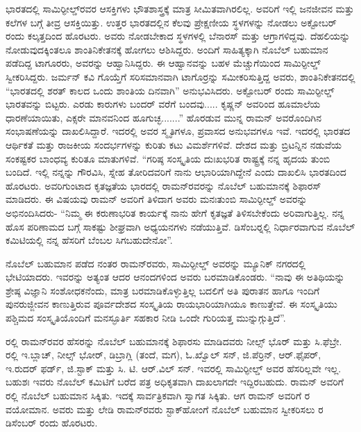 ಭಾರತದಲ್ಲಿ ಸಾಮಿರ್‍ಫೀಲ್ಡ್‌ರವರ ಆಸಕ್ತಿಗಳು ಭೌತಶಾಸ್ತ್ರಕ್ಕೆ ಮಾತ್ರ ಸೀಮಿತವಾಗಿರಲಿಲ್ಲ. ಅವರಿಗೆ ಇಲ್ಲಿ ಜನಜೀವನ ಮತ್ತು ಕಲೆಗಳ ಬಗ್ಗೆ ತೀವ್ರ ಆಸಕ್ತಿಯಿತ್ತು. ಉತ್ತರ ಭಾರತದಲ್ಲಿನ ಕೆಲವು ಪ್ರೇಕ್ಷಣೀಯ ಸ್ಥಳಗಳನ್ನು ನೋಡಲು  ಅಕ್ಟೋಬರ್ ರಂದು ಕಲ್ಕತ್ತದಿಂದ ಹೊರಟರು. ಅವರು ನೋಡಬೇಕಾದ ಸ್ಥಳಗಳಲ್ಲಿ ಬೆನಾರಸ್ ಮತ್ತು ಆಗ್ರಾಗಳಿದ್ದವು. ದೆಹಲಿಯನ್ನು ನೋಡುವುದಕ್ಕಿಂತಲೂ ಶಾಂತಿನಿಕೇತನಕ್ಕೆ ಹೋಗಲು ಆಶಿಸಿದ್ದರು. ಅಂದಿಗೆ ಸಾಹಿತ್ಯಕ್ಕಾಗಿ ನೊಬೆಲ್ ಬಹುಮಾನ ಪಡೆದಿದ್ದ ಟಾಗೂರರು, ಅವರನ್ನು ಆಹ್ವಾನಿಸಿದ್ದರು. ಈ ಆಹ್ವಾನವನ್ನು ಬಹಳ ಮೆಚ್ಚುಗೆಯಿಂದ ಸಾಮಿರ್‍ಫೀಲ್ಡ್ ಸ್ವೀಕರಿಸಿದ್ದರು. ಜರ್ಮನ್ ಕವಿ ಗೊಯ್ತೆಗೆ ಸರಿಸಮಾನವಾಗಿ ಟಾಗೊರ್‍ರನ್ನು ಸಮೀಕರಿಸುತ್ತಿದ್ದ ಅವರು, ಶಾಂತಿನಿಕೇತನದಲ್ಲಿ “ಭಾರತದಲ್ಲಿ ಶರತ್ ಕಾಲದ ಒಂದು ಶಾಂತಿಯ ದಿನವಾಗಿ” ಅನುಭವಿಸಿದರು. ಅಕ್ಟೋಬರ್  ರಂದು ಸಾಮಿರ್‍ಫೀಲ್ಡ್ ಭಾರತವನ್ನು ಬಿಟ್ಟರು. ಎರಡು ಕಾರುಗಳು ಬಂದರ್ ವರೆಗೆ ಬಂದವು..... ಕೃಷ್ಣನ್ ಅವರಿಂದ ಹೂಮಾಲೆಯ ಧಾರಣೆಯಾಯಿತು, ಎಕ್ಸರೇ ಮಾನವನಿಂದ ಹೂಗುಚ್ಛ.......” ಹೊರಡುವ ಮುನ್ನ ರಾಮನ್ ಅವರೊಂದಿಗಿನ ಸಂಭಾಷಣೆಯನ್ನು ದಾಖಲಿಸಿದ್ದಾರೆ. ಇದರಲ್ಲಿ ಅವರ ಸ್ಮೃತಿಗಳೂ, ಪ್ರವಾಸದ ಅನುಭವಗಳೂ ಇವೆ. ಇದರಲ್ಲಿ ಭಾರತದ ಆರ್ಥಿಕತೆ ಮತ್ತು ರಾಜಕೀಯ ಸಂದರ್ಭಗಳನ್ನು ಕುರಿತು ಕಟು ವಿಮರ್ಶೆಗಳಿವೆ. ದೇಶದ ಮತ್ತು ಬ್ರಿಟನ್ನಿನ ನಡುವೆಯ ಸಂಕಷ್ಟಕರ ಬಾಂಧವ್ಯ ಕುರಿತೂ ಮಾತುಗಳಿವೆ. “ಗರಿಷ್ಠ ಸಂಸ್ಕೃತಿಯ ದುಃಖಭರಿತ ರಾಷ್ಟ್ರಕ್ಕೆ ನನ್ನ ಹೃದಯ ತುಂಬಿ ಬಂದಿದೆ. ಇಲ್ಲಿ ನನ್ನನ್ನು ಗೌರವಿಸಿ, ಸ್ನೇಹ ತೋರಿದವರಿಗೆ ನಾನು ಆಭಾರಿಯಾಗಿದ್ದೇನೆ ಎಂದು ದಾಖಲಿಸಿ ಭಾರತದಿಂದ ಹೊರಟರು. ಅವರಿಗುಂಟಾದ ಕೃತಜ್ಞತೆಯ ಭಾರದಲ್ಲಿ ರಾಮನ್‍ರವರನ್ನು ನೊಬೆಲ್ ಬಹುಮಾನಕ್ಕೆ ಶಿಫಾರಸ್ ಮಾಡಿದರು. ಈ ವಿಷಯವು ರಾಮನ್ ಅವರಿಗೆ ತಿಳಿದಾಗ ಅವರು ಮನಃತುಂಬಿ ಸಾಮಿರ್‍ಫೀಲ್ಡ್ ಅವರನ್ನು ಅಭಿನಂದಿಸಿದರು- “ನಿಮ್ಮ ಈ ಕರುಣಾಭರಿತ ಕಾರ್ಯಕ್ಕೆ ನಾನು ಹೇಗೆ ಕೃತಜ್ಞತೆ ತಿಳಿಸಬೇಕೆಂದು ಅರಿವಾಗುತ್ತಿಲ್ಲ. ನನ್ನ ಹೊಸ ಪರಿಣಾಮದ ಬಗ್ಗೆ ಸಾಕಷ್ಟು ಶೀಘ್ರವಾಗಿ ಅಧ್ಯಯನಗಳು ನಡೆಯುತ್ತಿವೆ. ಡಿಸೆಂಬರ್‍ನಲ್ಲಿ ನಿರ್ಧಾರವಾಗುವ ನೊಬೆಲ್ ಕಮಿಟಿಯಲ್ಲಿ ನನ್ನ ಹೆಸರಿಗೆ ಬೆಂಬಲ ಸಿಗಬಹುದೇನೋ”.

ನೊಬೆಲ್ ಬಹುಮಾನ ಪಡೆದ ನಂತರ ರಾಮನ್‍ರವರು, ಸಾಮಿರ್‍ಫೀಲ್ಡ್ ಅವರನ್ನು ಮ್ಯೂನಿಕ್ ನಗರದಲ್ಲಿ ಭೇಟಿಯಾದರು. ಇವರನ್ನು ಅತ್ಯಂತ ಆದರ ಆನಂದಗಳಿಂದ ಅವರು ಬರಮಾಡಿಕೊಂಡರು. “ನಾವು ಈ ಅತಿಥಿಯನ್ನು ಶ್ರೇಷ್ಠ ವಿಜ್ಞಾನಿ ಸಂಶೋಧಕನೆಂದು, ಮಾತ್ರ ಬರಮಾಡಿಕೊಳ್ಳುತ್ತಿಲ್ಲ ಬದಲಿಗೆ ಅತಿ ಪುರಾತನ ಹಾಗೂ ಇಂದಿಗೆ ಪುನರುಜ್ಜೀವನ ಕಾಣುತ್ತಿರುವ ಪೂರ್ವದೇಶದ ಸಂಸ್ಕೃತಿಯ ರಾಯಭಾರಿಯಾಗಿಯೂ ಕಾಣುತ್ತೇವೆ. ಈ ಸಂಸ್ಕೃತಿಯು ಪಶ್ಚಿಮದ ಸಂಸ್ಕೃತಿಯೊಂದಿಗೆ ಮನಸ್ಫೂರ್ತಿ ಸಹಕಾರ ನೀಡಿ ಒಂದೇ ಗುರಿಯತ್ತ ಮುನ್ನುಗ್ಗುತ್ತಿದೆ”.

ರಲ್ಲಿ ರಾಮನ್‍ರವರ ಹೆಸರನ್ನು ನೊಬೆಲ್ ಬಹುಮಾನಕ್ಕೆ ಶಿಫಾರಸು ಮಾಡಿದವರು ನೀಲ್ಸ್ ಭೊರ್ ಮತ್ತು ಸಿ.ಫೆಬ್ರೇ. ರಲ್ಲಿ ಇ.ಬ್ಲಾಚ್, ನೀಲ್ಸ್ ಭೋರ್, ಡಿಬ್ರಾಗ್ಲಿ (ತಂದೆ, ಮಗ), ಓ.ಖ್ವೊಲ್ ಸನ್, ಜಿ.ಪೆರ್ರಿನ್, ಆರ್.ಫೈಪರ್, ಇ.ರುದರ್ ಫರ್ಡ್, ಜಿ.ಸ್ಟಾಕ್ ಮತ್ತು ಸಿ. ಟಿ. ಆರ್.ವಿಲ್ ಸನ್. ಇವರಲ್ಲಿ ಸಾಮಿರ್‍ಫೀಲ್ಡ್ ಅವರ ಹೆಸರಿಲ್ಲವೇ ಇಲ್ಲ. ಬಹುಶಃ ಇವರು ನೊಬೆಲ್ ಕಮಿಟಿಗೆ ಬರೆದ ಪತ್ರ ಅಧಿಕೃತವಾಗಿ ದಾಖಲಾಗದೇ ಇದ್ದಿರಬಹುದು. ರಾಮನ್ ಅವರಿಗೆ ರಲ್ಲಿ ನೊಬೆಲ್ ಬಹುಮಾನ ಸಿಕ್ಕಿತು. ಇದಕ್ಕೆ ಸಾರ್ವತ್ರಿಕವಾಗಿ ಸ್ವಾಗತ ಸಿಕ್ಕಿತು. ಆಗ ರಾಮನ್ ಅವರಿಗೆ  ರ ವಯೋಮಾನ. ಅವರು ಮತ್ತು ಲೇಡಿ ರಾಮನ್‍ರವರು ಸ್ಟಾಕ್‍ಹೋಂಗೆ ನೊಬೆಲ್ ಬಹುಮಾನ ಸ್ವೀಕರಿಸಲು ರ ಡಿಸೆಂಬರ್  ರಂದು ಹೊರಟರು.

